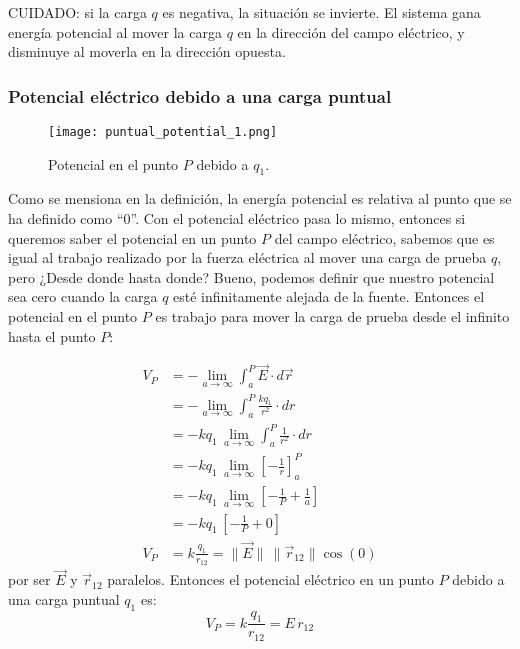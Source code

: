 \begin{tcolorbox}[mydanger]
    CUIDADO: si la carga \(q\) es negativa, la situación se invierte. El sistema gana energía potencial al mover la carga \(q\) en la dirección del campo eléctrico, y disminuye al moverla en la dirección opuesta.    
\end{tcolorbox}

\subsubsection{Potencial eléctrico debido a una carga puntual}

\begin{wrapfigure}{l}{0.32\textwidth}
    \centering
    \texttt{[image: puntual\_potential\_1.png]}
    \caption{Potencial en el punto \(P\) debido a \(q_1\).}
    \label{fig:potential_point_charge}
\end{wrapfigure}

Como se mensiona en la definición, la energía potencial es relativa al punto que se ha definido como ``0''. Con  el potencial eléctrico pasa lo mismo, entonces si queremos saber el potencial en un punto \(P\) del campo eléctrico, sabemos que es igual al trabajo realizado por la fuerza eléctrica al mover una carga de prueba \(q\), pero ¿Desde donde hasta donde? Bueno, podemos definir que nuestro potencial sea cero cuando la carga \(q\) esté infinitamente alejada de la fuente. Entonces el potencial en el punto \(P\) es trabajo para mover la carga de prueba desde el infinito hasta el punto \(P\):

\begin{align*}
    V_P &= - \lim_{a \to \infty}\int_{a}^P \vec{E} \cdot d\vec{r}\\
        &= - \lim_{a \to \infty}\int_{a}^P \frac{kq_1}{r^2} \cdot dr\\
        &= -kq_1 \, \lim_{a \to \infty} \int_{a}^P \frac{1}{r^2} \cdot dr\\
        &= -kq_1 \, \lim_{a \to \infty} \left[ -\frac{1}{r} \right]_{a}^P\\
        &= -kq_1 \, \lim_{a \to \infty} \left[ -\frac{1}{P} + \frac{1}{a} \right]\\
        &= -kq_1 \, \left[ -\frac{1}{P} + 0 \right] \\
    V_P &= k\frac{q_1}{r_{12}} = \lVert\vec{E}\rVert \, \lVert\vec{r}_{12}\rVert \cos(0)
\end{align*}
por ser \(\vec{E}\) y \(\vec{r}_{12}\) paralelos. Entonces el potencial eléctrico en un punto \(P\) debido a una carga puntual \(q_1\) es:
\begin{equation}
    \boxed{V_P = k\frac{q_1}{r_{12}} = E \, r_{12}}
    \label{eq:potential_point_charge}
\end{equation}

